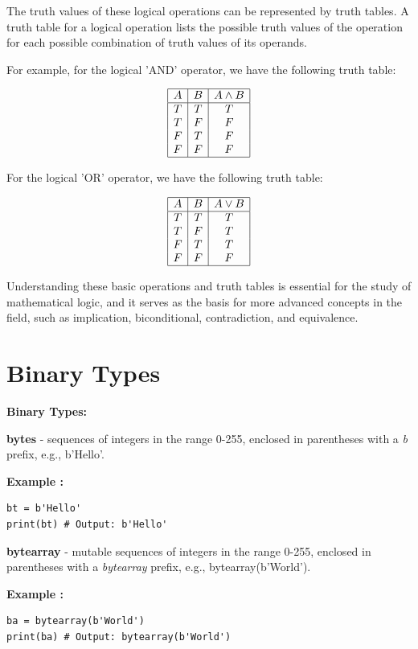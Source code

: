 \documentclass[12pt]{book}
\newtheorem{Example}{Example}[chapter]
\renewenvironment{Example}{\begin{trivlist}\item\relax
\textbf{Example \thesection: }}{\end{trivlist}}
\begin{document}
The truth values of these logical operations can be represented by truth tables. A truth table for a logical operation lists the possible truth values of the operation for each possible combination of truth values of its operands. 

For example, for the logical 'AND' operator, we have the following truth table:

\[
\begin{array}{|c|c|c|}
\hline
A & B & A \land B \\
\hline
T & T & T \\
T & F & F \\
F & T & F \\
F & F & F \\
\hline
\end{array}
\]

For the logical 'OR' operator, we have the following truth table:

\[
\begin{array}{|c|c|c|}
\hline
A & B & A \lor B \\
\hline
T & T & T \\
T & F & T \\
F & T & T \\
F & F & F \\
\hline
\end{array}
\]

Understanding these basic operations and truth tables is essential for the study of mathematical logic, and it serves as the basis for more advanced concepts in the field, such as implication, biconditional, contradiction, and equivalence.




\section{Binary Types}
\textbf{Binary Types:}
\begin{itemize}
\item \textbf{bytes} - sequences of integers in the range 0-255, enclosed in parentheses with a \textit{b} prefix, e.g., b'Hello'.
\begin{Example}
\begin{lstlisting}
bt = b'Hello'
print(bt) # Output: b'Hello'
\end{lstlisting}
\end{Example}
\item \textbf{bytearray} - mutable sequences of integers in the range 0-255, enclosed in parentheses with a \textit{bytearray} prefix, e.g., bytearray(b'World').
\begin{Example}
\begin{lstlisting}
ba = bytearray(b'World')
print(ba) # Output: bytearray(b'World')
\end{lstlisting}
\end{Example}
\end{itemize}
\end{document}
